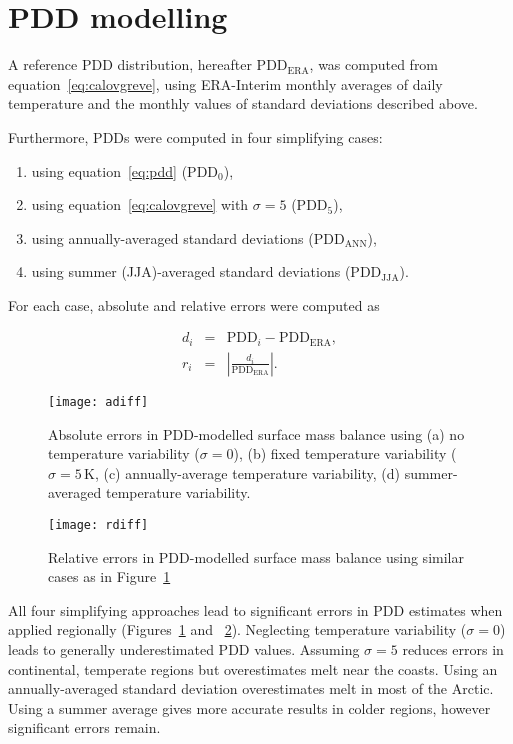 \documentclass[twocolumn]{igs}
\begin{document}

\section{PDD modelling}

A reference PDD distribution, hereafter $\mathrm{PDD_{ERA}}$, was computed from equation~\ref{eq:calovgreve}, using ERA-Interim monthly averages of daily temperature and the monthly values of standard deviations described above.

Furthermore, PDDs were computed in four simplifying cases:

\begin{enumerate}
  \item using equation~\ref{eq:pdd} ($\mathrm{PDD_{0}}$),
  \item using equation~\ref{eq:calovgreve} with $\sigma=5$ ($\mathrm{PDD_{5}}$),
  \item using annually-averaged standard deviations ($\mathrm{PDD_{ANN}}$),
  \item using summer (JJA)-averaged standard deviations ($\mathrm{PDD_{JJA}}$).
\end{enumerate}

For each case, absolute and relative errors were computed as

\begin{eqnarray}
  d_i &=& \mathrm{PDD}_i - \mathrm{PDD_{ERA}}, \\
  r_i &=& \left|\frac{d_i}{\mathrm{PDD_{ERA}}}\right|.
\end{eqnarray}

\begin{figure}
  \centering\texttt{[image: adiff]}
  \caption{Absolute errors in PDD-modelled surface mass balance using (a) no temperature variability ($\sigma=0$), (b) fixed temperature variability ($\sigma=5\,\mathrm{K}$, (c) annually-average temperature variability, (d) summer-averaged temperature variability.}
  \label{fig:adiff}
\end{figure}

\begin{figure}
  \centering\texttt{[image: rdiff]}
  \caption{Relative errors in PDD-modelled surface mass balance using similar cases as in Figure~\ref{fig:adiff}}
  \label{fig:rdiff}
\end{figure}

All four simplifying approaches lead to significant errors in PDD estimates when applied regionally (Figures~\ref{fig:adiff} and ~\ref{fig:rdiff}). Neglecting temperature variability ($\sigma=0$) leads to generally underestimated PDD values. Assuming $\sigma=5$ reduces errors in continental, temperate regions but overestimates melt near the coasts. Using an annually-averaged standard deviation overestimates melt in most of the Arctic. Using a summer average gives more accurate results in colder regions, however significant errors remain.
\end{document}
